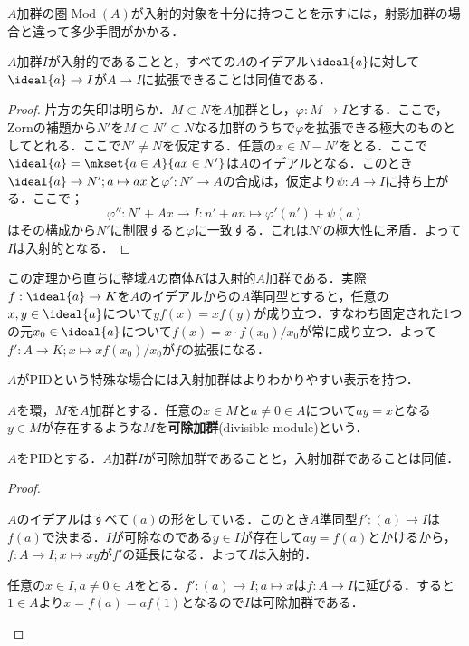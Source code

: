 $A$加群の圏$\operatorname{Mod}(A)$が入射的対象を十分に持つことを示すには，射影加群の場合と違って多少手間がかかる．

\begin{thm}[Baerの基準]\label{thm:Bear's Criterion}
	$A$加群$I$が入射的であることと，すべての$A$のイデアル$\ideal{a}$に対して$\ideal{a}\to I$が$A\to I$に拡張できることは同値である．
\end{thm}

\begin{proof}
	片方の矢印は明らか．$M\subset N$を$A$加群とし，$\varphi:M\to I$とする．ここで，Zornの補題から$N'$を$M\subset N'\subset N$なる加群のうちで$\varphi$を拡張できる極大のものとしてとれる．ここで$N'\neq N$を仮定する．任意の$x\in N-N'$をとる．ここで$\ideal{a}=\mkset{a\in A}{ax\in N'}$は$A$のイデアルとなる．このとき$\ideal{a}\to N';a\mapsto ax$と$\varphi':N'\to A$の合成は，仮定より$\psi:A\to I$に持ち上がる．ここで；
	\[\varphi'':N'+Ax\to I:n'+an\mapsto \varphi'(n')+\psi(a)\]
	はその構成から$N'$に制限すると$\varphi$に一致する．これは$N'$の極大性に矛盾．よって$I$は入射的となる． 
\end{proof}

この定理から直ちに整域$A$の商体$K$は入射的$A$加群である．実際$f:\ideal{a}\to K$を$A$のイデアルからの$A$準同型とすると，任意の$x,y\in \ideal{a}$について$yf(x)=xf(y)$が成り立つ．すなわち固定された1つの元$x_0\in \ideal{a}$について$f(x)=x\cdot f(x_0)/x_0$が常に成り立つ．よって$f':A\to K;x\mapsto xf(x_0)/x_0$が$f$の拡張になる．

$A$がPIDという特殊な場合には入射加群はよりわかりやすい表示を持つ．
\begin{defi}[可除加群]
	$A$を環，$M$を$A$加群とする．任意の$x\in M$と$a\neq0\in A$について$ay=x$となる$y\in M$が存在するような$M$を\textbf{可除加群}(divisible module)という．
\end{defi}

\begin{prop}
	$A$をPIDとする．$A$加群$I$が可除加群であることと，入射加群であることは同値．
\end{prop}

\begin{proof}
	\begin{eqv}
		\item $A$のイデアルはすべて$(a)$の形をしている．このとき$A$準同型$f':(a)\to I$は$f(a)$で決まる．$I$が可除なのである$y\in I$が存在して$ay=f(a)$とかけるから，$f:A\to I;x\mapsto xy$が$f'$の延長になる．よって$I$は入射的．
		
		\item 任意の$x\in I,a\neq0\in A$をとる．$f':(a)\to I;a\mapsto x$は$f:A\to I$に延びる．すると$1\in A$より$x=f(a)=af(1)$となるので$I$は可除加群である．
	\end{eqv}
\end{proof}

